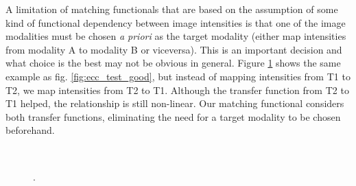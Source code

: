 A limitation of matching functionals that are based on the assumption of some kind of functional dependency between image intensities is that one of the image modalities must be chosen \emph{a priori} as the target modality (either map intensities from modality A to modality B or viceversa). This is an important decision and what choice is the best may not be obvious in general. Figure \ref{fig:ecc_test_bad} shows the same example as fig. \ref{fig:ecc_test_good}, but instead of mapping intensities from T1 to T2, we map intensities from T2 to T1. Although the transfer function from T2 to T1 helped, the relationship is still non-linear. Our matching functional considers both transfer functions, eliminating the need for a target modality to be chosen beforehand.\\

\begin{figure}[t!]
\centering
    \\
    \caption{.}
\label{fig:ecc_test_bad}
\end{figure}








